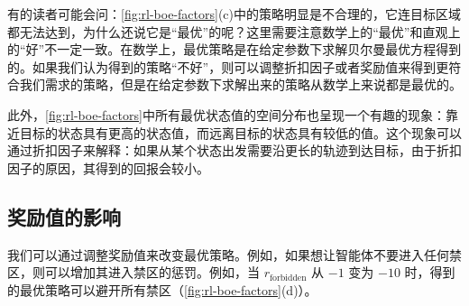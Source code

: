 有的读者可能会问：\cref{fig:rl-boe-factors}(c)中的策略明显是不合理的，它连目标区域都无法达到，为什么还说它是“最优”的呢？这里需要注意数学上的“最优”和直观上的“好”不一定一致。在数学上，最优策略是在给定参数下求解贝尔曼最优方程得到的。如果我们认为得到的策略“不好”，则可以调整折扣因子或者奖励值来得到更符合我们需求的策略，但是在给定参数下求解出来的策略从数学上来说都是最优的。

此外，\cref{fig:rl-boe-factors}中所有最优状态值的空间分布也呈现一个有趣的现象：靠近目标的状态具有更高的状态值，而远离目标的状态具有较低的值。这个现象可以通过折扣因子来解释：如果从某个状态出发需要沿更长的轨迹到达目标，由于折扣因子的原因，其得到的回报会较小。

\subsection*{奖励值的影响}

我们可以通过调整奖励值来改变最优策略。例如，如果想让智能体不要进入任何禁区，则可以增加其进入禁区的惩罚。例如，当 $r_{\mathrm{forbidden}}$ 从 $-1$ 变为 $-10$ 时，得到的最优策略可以避开所有禁区（\cref{fig:rl-boe-factors}(d)）。

